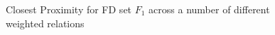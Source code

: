 \begin{figure}
\centerline{}
\caption{\label{graph:4.1} {Closest Proximity for FD set $F_1$ across a number of different weighted relations}}
\end{figure}

\smallskip

